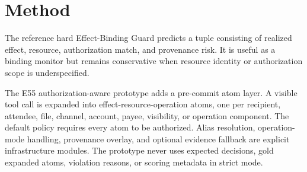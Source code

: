 \section{Method}
The reference hard Effect-Binding Guard predicts a tuple consisting of realized effect, resource, authorization match, and provenance risk. It is useful as a binding monitor but remains conservative when resource identity or authorization scope is underspecified.

The E55 authorization-aware prototype adds a pre-commit atom layer. A visible tool call is expanded into effect-resource-operation atoms, one per recipient, attendee, file, channel, account, payee, visibility, or operation component. The default policy requires every atom to be authorized. Alias resolution, operation-mode handling, provenance overlay, and optional evidence fallback are explicit infrastructure modules. The prototype never uses expected decisions, gold expanded atoms, violation reasons, or scoring metadata in strict mode.
